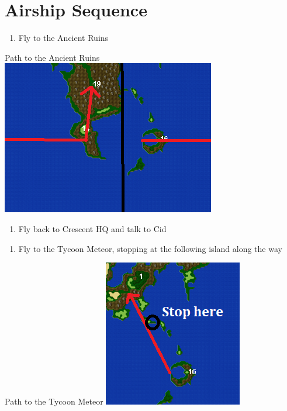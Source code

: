\chapter{Airship Sequence}

\vspace{\baselineskip}

\begin{paracol}{2}

\begin{enumerate}
    \item Fly to the Ancient Ruins
\end{enumerate}

\switchcolumn
\begin{misc}{Path to the Ancient Ruins}
    \includegraphics[scale=0.7]{../Graphics/Maps/5. To Ruins.png}
\end{misc}

\switchcolumn
\resume
\begin{enumerate}[resume]
    \item Fly back to Crescent HQ and talk to Cid
\end{enumerate}

\switchcolumnTwice[*]
\newpage
\begin{enumerate}[resume]
    \item Fly to the Tycoon Meteor, stopping at the following island along the way
\end{enumerate}

\switchcolumn
\begin{misc}{Path to the Tycoon Meteor}
    \includegraphics[scale=1.45]{../Graphics/Maps/6. To Tycoon Meteor.png}
\end{misc}


\end{paracol}
